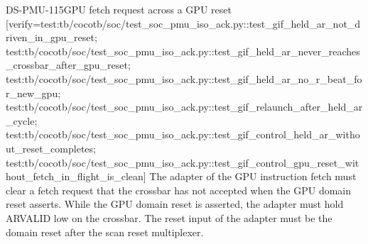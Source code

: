 \begin{requirement}{DS-PMU-115}{GPU fetch request across a GPU reset}
[verify={test:tb/cocotb/soc/test_soc_pmu_iso_ack.py::test_gif_held_ar_not_driven_in_gpu_reset; test:tb/cocotb/soc/test_soc_pmu_iso_ack.py::test_gif_held_ar_never_reaches_crossbar_after_gpu_reset; test:tb/cocotb/soc/test_soc_pmu_iso_ack.py::test_gif_held_ar_no_r_beat_for_new_gpu; test:tb/cocotb/soc/test_soc_pmu_iso_ack.py::test_gif_relaunch_after_held_ar_cycle; test:tb/cocotb/soc/test_soc_pmu_iso_ack.py::test_gif_control_held_ar_without_reset_completes; test:tb/cocotb/soc/test_soc_pmu_iso_ack.py::test_gif_control_gpu_reset_without_fetch_in_flight_is_clean}]
The adapter  of the GPU instruction fetch must clear a fetch request that the crossbar has not accepted when the GPU domain reset asserts. While the GPU domain reset is asserted, the adapter must hold ARVALID low on the crossbar. The reset input of the adapter must be the domain reset after the scan reset multiplexer.
\end{requirement}

